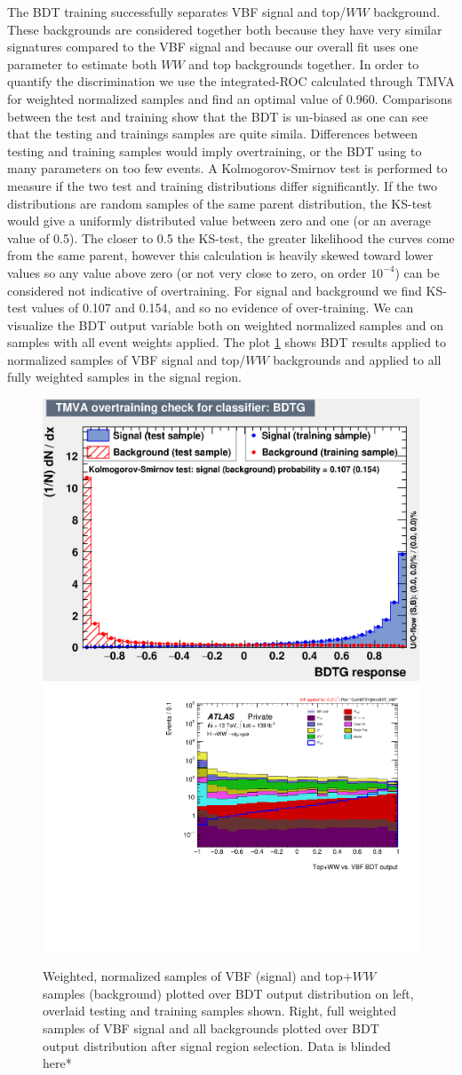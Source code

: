 The BDT training successfully separates VBF signal and top/$WW$ background. These backgrounds are considered together both because they have very similar signatures compared to the VBF signal and because our overall fit uses one parameter to estimate both $WW$ and top backgrounds together. In order to quantify the discrimination we use the integrated-ROC calculated through TMVA for weighted normalized samples and find an optimal value of 0.960. Comparisons between the test and training show that the BDT is un-biased as one can see that the testing and trainings samples are quite simila. Differences between testing and training samples would imply overtraining, or the BDT using to many parameters on too few events. A Kolmogorov-Smirnov test is performed to measure if the two test and training distributions differ significantly. If the two distributions are random samples of the same parent distribution, the KS-test would give a uniformly distributed value between zero and one (or an average value of 0.5). The closer to 0.5 the KS-test, the greater likelihood the curves come from the same parent, however this calculation is heavily skewed toward lower values so any value above zero (or not very close to zero, on order $10^{-4}$) can be considered not indicative of overtraining. For signal and background we find KS-test values of 0.107 and 0.154, and so no evidence of over-training. We can visualize the BDT output variable both on weighted normalized samples and on samples with all event weights applied. The plot \ref{fig:SRBDTresult} shows BDT results applied to normalized samples of VBF signal and top/$WW$ backgrounds and applied to all fully weighted samples in the signal region. 

\begin{figure}[!htbp]
\centering
  \includegraphics[width=.45\linewidth]{Pictures/VBFvsWW+Top/overtrain_BDTG.eps}
  \includegraphics[width=.35\linewidth]{Pictures/run2-emme-CutVBFDYjjMin-BDT_VBF-log.pdf}
\caption{Weighted, normalized samples of VBF (signal) and top$+WW$ samples (background) plotted over BDT output distribution on left, overlaid testing and training samples shown. Right, full weighted samples of VBF signal and all backgrounds plotted over BDT output distribution after signal region selection. Data is blinded here*}
\label{fig:SRBDTresult}
\end{figure}

